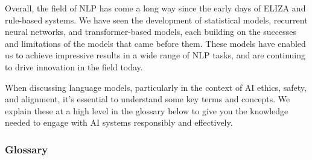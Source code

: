 \documentclass[12pt]{article}
\begin{document}
Overall, the field of NLP has come a long way since the early days of ELIZA and rule-based systems. We have seen the development of statistical models, recurrent neural networks, and transformer-based models, each building on the successes and limitations of the models that came before them. These models have enabled us to achieve impressive results in a wide range of NLP tasks, and are continuing to drive innovation in the field today.

When discussing language models, particularly in the context of AI ethics, safety, and alignment, it's essential to understand some key terms and concepts. We explain these at a high level in the glossary below to give you the knowledge needed to engage with AI systems responsibly and effectively. 
\subsubsection{Glossary}\label{glossary}
\end{document}
